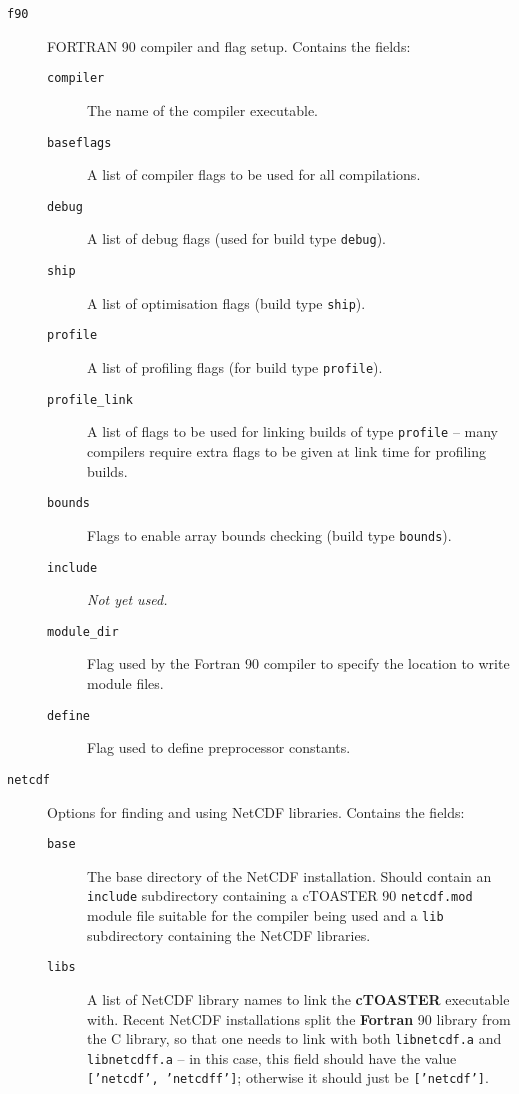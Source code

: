\documentclass[a4paper,10pt,article]{memoir}
\begin{document}
\begin{description}
  \item[\texttt{f90}]{FORTRAN 90 compiler and flag setup.  Contains
    the fields:
    \begin{description}
      \item[\texttt{compiler}]{The name of the compiler executable.}
      \item[\texttt{baseflags}]{A list of compiler flags to be used
        for all compilations.}
      \item[\texttt{debug}]{A list of debug flags (used for build type
        \texttt{debug}).}
      \item[\texttt{ship}]{A list of optimisation flags (build type
        \texttt{ship}).}
      \item[\texttt{profile}]{A list of profiling flags (for build type
        \texttt{profile}).}
      \item[\texttt{profile\_link}]{A list of flags to be used for
        linking builds of type \texttt{profile} -- many compilers
        require extra flags to be given at link time for profiling
        builds.}
      \item[\texttt{bounds}]{Flags to enable array bounds checking
        (build type \texttt{bounds}).}
      \item[\texttt{include}]{\emph{Not yet used.}}
      \item[\texttt{module\_dir}]{Flag used by the Fortran 90 compiler
        to specify the location to write module files.}
      \item[\texttt{define}]{Flag used to define preprocessor
        constants.}
    \end{description}}
  \item[\texttt{netcdf}]{Options for finding and using NetCDF
    libraries.  Contains the fields:
    \begin{description}
      \item[\texttt{base}]{The base directory of the NetCDF
        installation.  Should contain an \texttt{include} subdirectory
        containing a cTOASTER 90 \texttt{netcdf.mod} module file
        suitable for the compiler being used and a \texttt{lib}
        subdirectory containing the NetCDF libraries.}
      \item[\texttt{libs}]{A list of NetCDF library names to link the
        \textbf{cTOASTER} executable with.  Recent NetCDF installations split the
        \textbf{Fortran} 90 library from the C library, so that one needs to
        link with both \texttt{libnetcdf.a} and \texttt{libnetcdff.a}
        -- in this case, this field should have the value
        \texttt{['netcdf', 'netcdff']}; otherwise it should just be
        \texttt{['netcdf']}.}
    \end{description}}
\end{description}
\end{document}
